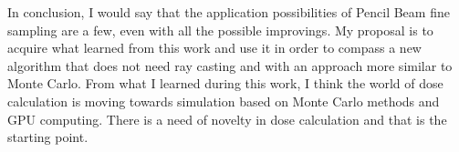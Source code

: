 \documentclass[12pt, a4paper, twoside]{book}
\begin{document}
In conclusion, I would say that the application possibilities of Pencil Beam fine sampling are a few, even with all the possible improvings. My proposal is to acquire what learned from this work and use it in order to compass a new algorithm that does not need ray casting and with an approach more similar to Monte Carlo. From what I learned during this work, I think the world of dose calculation is moving towards simulation based on Monte Carlo methods and GPU computing. There is a need of novelty in dose calculation and that is the starting point.



\listoffigures
\listoftables
\end{document}
